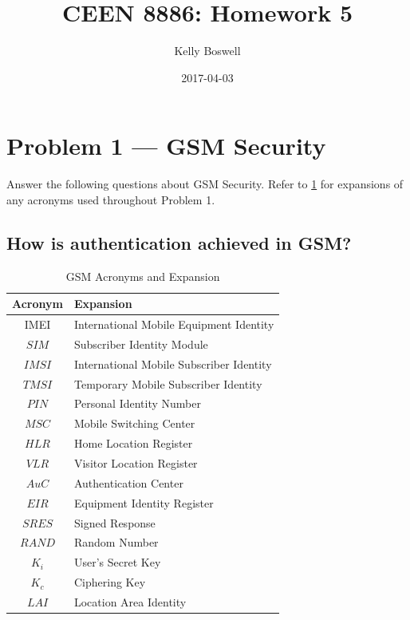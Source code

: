 \documentclass[a4paper]{report}
\title{CEEN 8886: Homework 5}
\date{2017-04-03}
\author{Kelly Boswell}
\begin{document}
\maketitle


\newpage


\section{Problem 1 --- GSM Security}

Answer the following questions about GSM Security. Refer to \ref{table:prob1} for expansions of any
    acronyms used throughout Problem 1.

\subsection{How is authentication achieved in GSM?}

\begin{table}
\caption{GSM Acronyms and Expansion}
\label{table:prob1}
\begin{center}
\begin{tabular}{| c | l |}
\hline
Acronym & Expansion \\
\hline
IMEI & International Mobile Equipment Identity \\
\hline
$SIM$ & Subscriber Identity Module \\
\hline
$IMSI$ & International Mobile Subscriber Identity \\
\hline
$TMSI$ & Temporary Mobile Subscriber Identity \\
\hline
$PIN$ & Personal Identity Number \\
\hline
$MSC$ & Mobile Switching Center \\
\hline
$HLR$ & Home Location Register \\
\hline
$VLR$ & Visitor Location Register \\
\hline
$AuC$ & Authentication Center \\
\hline
$EIR$ & Equipment Identity Register \\
\hline
$SRES$ & Signed Response \\
\hline
$RAND$ & Random Number \\
\hline
$K_i$ & User's Secret Key \\
\hline
$K_c$ & Ciphering Key \\
\hline
$LAI$ & Location Area Identity \\
\hline
\end{tabular}
\end{center}
\end{table}
\end{document}

